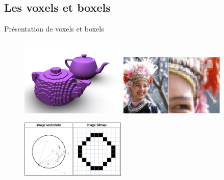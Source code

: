 \documentclass{beamer}
\begin{document}
\subsection{Les voxels et boxels}
\begin{frame}{Présentation de voxels et boxels}
  \begin{center}
    \begin{figure}
      \includegraphics[width=5cm]{Images/Images_Alexis/voxel_teapot.jpg}
      \includegraphics[width=5cm]{Images/Images_Alexis/example_matricielle.jpg}
    \end{figure}
    \begin{figure}
      \includegraphics[width=5cm]{Images/Images_Alexis/comparaison_vecteur_matrice.png}
    \end{figure}
  \end{center}
\end{frame}
\end{document}
